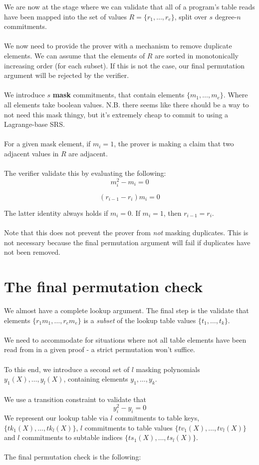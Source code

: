 \documentclass[11pt]{article} %
\begin{document}
We are now at the stage where we can validate that all of a program's table reads have been mapped into the set of values $R = \{ r_1, \ldots, r_e \}$, split over $s$ degree-$n$ commitments.
\\
\\
We now need to provide the prover with a mechanism to remove duplicate elements. We can assume that the elements of $R$ are sorted in monotonically increasing order (for each subset). If this is not the case, our final permutation argument will be rejected by the verifier.
\\
\\
We introduce $s$ \textbf{mask} commitments, that contain elements $\{ m_1, \ldots, m_e \}$. Where all elements take boolean values. N.B. there seems like there should be a way to not need this mask thingy, but it's extremely cheap to commit to using a Lagrange-base SRS.
\\
\\
For a given mask element, if $m_i = 1$, the prover is making a claim that two adjacent values in $R$ are adjacent.
\\
\\
The verifier validate this by evaluating the following:
$$
m_i^2 - m_i = 0
$$

$$
(r_{i-1} - r_i)m_i = 0
$$

The latter identity always holds if $m_i = 0$. If $m_i = 1$, then $r_{i-1} = r_i$.
\\
\\
Note that this does not prevent the prover from \textit{not} masking duplicates. This is not necessary because the final permutation argument will fail if duplicates have not been removed.

\section{The final permutation check}

We almost have a complete lookup argument. The final step is the validate that elements $\{r_1m_1, \ldots, r_em_e \}$ is a \textit{subset} of the lookup table values $\{ t_1, \ldots, t_k \}$.
\\
\\
We need to accommodate for situations where not all table elements have been read from in a given proof - a strict permutation won't suffice.
\\
\\
To this end, we introduce a second set of $l$ masking polynomials $y_1(X), \ldots, y_l(X)$, containing elements $y_1, \ldots, y_k$.
\\
\\
We use a transition constraint to validate that
$$
y_i^2 - y_i = 0
$$
We represent our lookup table via $l$ commitments to table keys, $\{tk_1(X), \ldots, tk_l(X)\}$, $l$ commitments to table values $\{ tv_1(X), \ldots, tv_l(X) \}$ and $l$ commitments to subtable indices $\{ts_1(X), \ldots, ts_l(X) \}$.
\\
\\
The final permutation check is the following:
\end{document}
